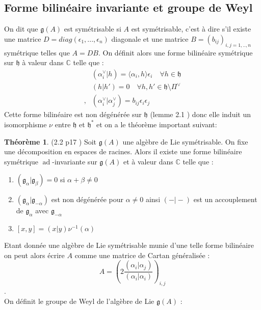\documentclass[12pt]{article}
\DeclareMathOperator{\ad}{ad}
\theoremstyle{definition}
\newtheorem{theo}{Théorème}[section]
\begin{document}
\subsection{Forme bilinéaire invariante et groupe de Weyl}
On dit que $\mathfrak{g}(A)$ est symétrisable si $A$ est symétrisable, c'est à dire s'il existe une matrice  $D=diag(\epsilon_1,...,\epsilon_n)$ diagonale et une matrice $B=(b_{ij})_{i,j=1,..,n}$ symétrique telles que $A=DB$. On définit alors une forme bilinéaire symétrique sur $\mathfrak{h}$ à valeur dans $\mathbb{C}$ telle que : 
\begin{align}
&(\alpha_i^{\vee}\vert h)=\langle \alpha_i,h\rangle\epsilon_i\quad\forall h\in\mathfrak{h}\\
&(h\vert h')=0\quad\forall h,h'\in\mathfrak{h}\setminus\Pi^{\vee}\\,
&(\alpha_i^{\vee}\vert\alpha_j^{\vee})=b_{ij}\epsilon_{i}\epsilon_{j}
\end{align}
Cette forme bilinéaire est non dégénérée sur $\mathfrak{h}$ (lemme 2.1 \cite{Kac}) donc elle induit un isomorphisme $\nu$ entre $\mathfrak{h}$ et $\mathfrak{h}^{\ast}$ et on a le théorème important suivant:
\begin{theo}(2.2 p17 \cite{Kac})
Soit $\mathfrak{g}(A)$ une algèbre de Lie symétrisable. On fixe une décomposition en espaces de racines. Alors il existe une forme bilinéaire symétrique $\ad$-invariante sur $\mathfrak{g}(A)$ et à valeur dans $\mathbb{C}$ telle que :
\begin{enumerate}
\item $(\mathfrak{g}_{\alpha}\vert\mathfrak{g}_{\beta})=0$ si $\alpha +\beta\neq 0$
\item $(\mathfrak{g}_{\alpha}\vert\mathfrak{g}_{-\alpha})$ est non dégénérée pour $\alpha\neq 0$ ainsi $(-\vert -)$ est un accouplement de $\mathfrak{g}_{\alpha}$ avec $\mathfrak{g}_{-\alpha}$ 
\item $[x,y]=(x\vert y)\nu^{-1}(\alpha)$
\end{enumerate}
\end{theo}
Etant donnée une algèbre de Lie symétrisable munie d'une telle forme bilinéaire on peut alors écrire $A$ comme une matrice de Cartan généralisée :$$A=\left(2\frac{(\alpha_i\vert\alpha_j)}{(\alpha_i\vert\alpha_i)}\right)_{i,j}$$.\\ On définit le groupe de Weyl de l'algèbre de Lie $\mathfrak{g}(A)$ :		
\end{document}
